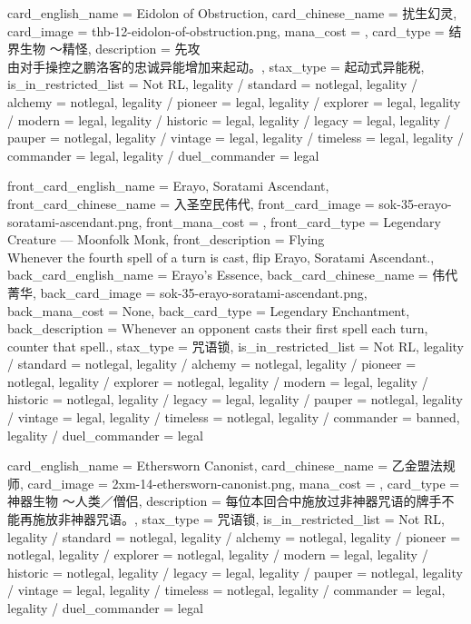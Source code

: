 \documentclass[lang = cn, color = black, 10pt]{AllThatStax}
\begin{document}
\card
{
	card_english_name = {Eidolon of Obstruction},
	card_chinese_name = {扰生幻灵},
	card_image = thb-12-eidolon-of-obstruction.png,
	mana_cost = ,
	card_type = 结界生物 ～精怪,
	description = {先攻\\
		由对手操控之鹏洛客的忠诚异能增加来起动。},
	stax_type = 起动式异能税,
	is_in_restricted_list = Not RL,
	legality / standard = notlegal,
	legality / alchemy = notlegal,
	legality / pioneer = legal,
	legality / explorer = legal,
	legality / modern = legal,
	legality / historic = legal,
	legality / legacy = legal,
	legality / pauper = notlegal,
	legality / vintage = legal,
	legality / timeless = legal,
	legality / commander = legal,
	legality / duel_commander = legal
}

\mfcard
{
	front_card_english_name = {Erayo, Soratami Ascendant},
	front_card_chinese_name = {入圣空民伟代},
	front_card_image = sok-35-erayo-soratami-ascendant.png,
	front_mana_cost = ,
	front_card_type = Legendary Creature — Moonfolk Monk,
	front_description = {Flying\\
		Whenever the fourth spell of a turn is cast, flip Erayo, Soratami Ascendant.},
	back_card_english_name = {Erayo's Essence},
	back_card_chinese_name = {伟代菁华},
	back_card_image = sok-35-erayo-soratami-ascendant.png,
	back_mana_cost = None,
	back_card_type = Legendary Enchantment,
	back_description = {Whenever an opponent casts their first spell each turn, counter that spell.},
	stax_type = 咒语锁,
	is_in_restricted_list = Not RL,
	legality / standard = notlegal,
	legality / alchemy = notlegal,
	legality / pioneer = notlegal,
	legality / explorer = notlegal,
	legality / modern = legal,
	legality / historic = notlegal,
	legality / legacy = legal,
	legality / pauper = notlegal,
	legality / vintage = legal,
	legality / timeless = notlegal,
	legality / commander = banned,
	legality / duel_commander = legal
}

\card
{
	card_english_name = {Ethersworn Canonist},
	card_chinese_name = {乙金盟法规师},
	card_image = 2xm-14-ethersworn-canonist.png,
	mana_cost = ,
	card_type = 神器生物 ～人类／僧侣,
	description = {每位本回合中施放过非神器咒语的牌手不能再施放非神器咒语。},
	stax_type = 咒语锁,
	is_in_restricted_list = Not RL,
	legality / standard = notlegal,
	legality / alchemy = notlegal,
	legality / pioneer = notlegal,
	legality / explorer = notlegal,
	legality / modern = legal,
	legality / historic = notlegal,
	legality / legacy = legal,
	legality / pauper = notlegal,
	legality / vintage = legal,
	legality / timeless = notlegal,
	legality / commander = legal,
	legality / duel_commander = legal
}
\end{document}
